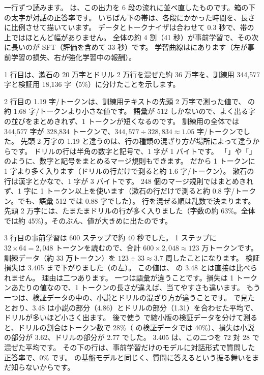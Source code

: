 一行ずつ読みます。
は、この出力を 6 段の流れに並べ直したものです。箱の下の太字が対話の正答率です。
いちばん下の帯は、各段にかかった時間を、長さに比例させて描いています。
データとトークナイザは合わせて 0.3 秒で、帯の上ではほとんど幅がありません。
全体の約 4 割（41 秒）が事前学習で、その次に長いのが SFT（評価を含めて 33 秒）です。
学習曲線はにあります（左が事前学習の損失、右が強化学習中の報酬）。

1 行目は、漱石の 20 万字とドリル 2 万行を混ぜた約 36 万字を、訓練用 344,577 字と検証用 18,136 字（5\%）に分けたことを示します。

2 行目の 1.19 字/トークンは、訓練用テキストの先頭 2 万字で測った値で、 の約 1.68 字/トークンより小さな値です。
語彙が 512 しかないので、よく出る字の並びをまとめきれず、1 トークンが短くなるのです。
訓練用の全体では 344,577 字が 328,834 トークンで、$344{,}577\div328{,}834\approx1.05$ 字/トークンでした。
先頭 2 万字の 1.19 と違うのは、行の種類の混ざり方が場所によって違うからです。
ドリルの行は半角の数字と記号で、1 字が 1 バイトです。
「」や「」のように、数字と記号をまとめるマージ規則もできます。
だから 1 トークンに 1 字より多く入ります（ドリルの行だけで測ると約 1.6 字/トークン）。
漱石の行は漢字とかなで、1 字が 3 バイトです。
248 個のマージ規則ではまとめきれず、1 字に 1 トークン以上を使います（漱石の行だけで測ると約 0.8 字/トークン。でも、語彙 512 では 0.88 字でした）。
行を混ぜる順は乱数で決まります。
先頭 2 万字には、たまたまドリルの行が多く入りました（字数の約 63\%。全体では約 45\%）。そのぶん、値が大きめに出たのです。

3 行目の事前学習は 600 ステップで約 40 秒でした。
1 ステップに $32\times64 = 2{,}048$ トークンを読むので、合計 $600\times2{,}048\approx 123$ 万トークンです。
訓練データ（約 33 万トークン）を $123\div33\approx3.7$ 周したことになります。
検証損失は 3.405 まで下がりました（の左）。
この値は、 の 3.48 とは直接は比べられません。
理由は二つあります。
一つは語彙が違うことです。損失は 1 トークンあたりの値なので、1 トークンの長さが違えば、当てやすさも違います。
もう一つは、検証データの中の、小説とドリルの混ざり方が違うことです。
で見たとおり、3.48 は小説の部分（4.86）とドリルの部分（1.31）を合わせた平均で、ドリルが多いほど小さく出ます。
後で使う  で縮小版の検証データを分けて測ると、ドリルの割合はトークン数で 28\%（ の検証データでは 40\%）、損失は小説の部分が 3.62、ドリルの部分が 2.77 でした。
3.405 は、この二つを 72 対 28 で混ぜた平均です。
その下の行は、事前学習だけのモデルに対話形式で質問した正答率で、0\% です。
の基盤モデルと同じく、質問に答えるという振る舞いをまだ知らないからです。

